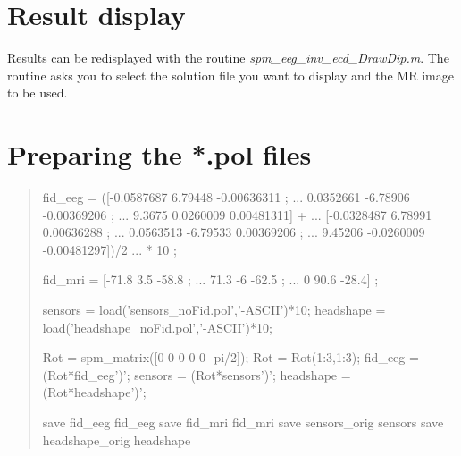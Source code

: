 \section{Result display}

Results can be redisplayed with the routine {\it spm\_eeg\_inv\_ecd\_DrawDip.m}. The routine asks you to select the solution file you want to display and the MR image to be used.

\section{Preparing the *.pol files}
\begin{quote}
 
 
fid\_eeg = ([-0.0587687  6.79448 -0.00636311 ; ...
            0.0352661   -6.78906    -0.00369206 ; ...
            9.3675  0.0260009   0.00481311] + ...
           [-0.0328487  6.78991 0.00636288 ; ...
            0.0563513   -6.79533    0.00369206 ; ...
            9.45206 -0.0260009  -0.00481297])/2 ...
            * 10 ; %
 
fid\_mri = [-71.8 3.5 -58.8 ; ...
            71.3 -6  -62.5 ; ...
            0   90.6 -28.4]        ;
            
sensors = load('sensors\_noFid.pol','-ASCII')*10;
headshape = load('headshape\_noFid.pol','-ASCII')*10;
 
%
 
Rot = spm\_matrix([0 0 0 0 0 -pi/2]); Rot = Rot(1:3,1:3);
fid\_eeg = (Rot*fid\_eeg')';
sensors = (Rot*sensors')';
headshape = (Rot*headshape')';
 
save fid\_eeg fid\_eeg
save fid\_mri fid\_mri
save sensors\_orig sensors
save headshape\_orig headshape

\end{quote}


